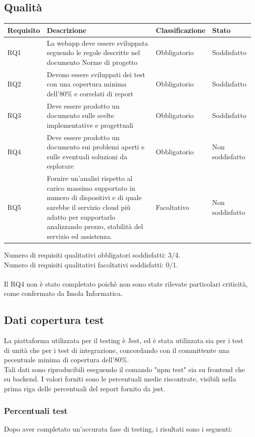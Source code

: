 \documentclass[12pt]{article}
\begin{document}
	\subsection{Qualità}
	\begin{tabular}{ |p{1.8cm}|p{5.2cm}|p{3cm}| p{2cm}| }
	\hline
	Requisito& Descrizione &Classificazione & Stato \\
	\hline
	RQ1 & La webapp deve essere sviluppata seguendo le regole descritte nel documento Norme di progetto & Obbligatorio & Soddisfatto \\
	RQ2 & Devono essere sviluppati dei test con una copertura minima dell'80\% e correlati di report & Obbligatorio & Soddisfatto\\
	RQ3 & Deve essere prodotto un documento sulle scelte implementative e progettuali & Obbligatorio & Soddisfatto \\
	RQ4 & Deve essere prodotto un documento sui problemi aperti e sulle eventuali soluzioni da esplorare & Obbligatorio & Non soddisfatto \\
	RQ5 & Fornire un’analisi rispetto al carico massimo supportato in numero di dispositivi e di quale sarebbe il servizio cloud più adatto per supportarlo analizzando prezzo, stabilità del servizio ed assistenza.  &  Facoltativo & Non soddisfatto \\
	\hline
	
	\end{tabular}
	Numero di requisiti qualitativi obbligatori soddisfatti: 3/4.\\
	Numero di requisiti qualitativi facoltativi soddisfatti: 0/1.
	\\
	\\

	Il RQ4 non è stato completato poichè non sono state rilevate particolari criticità, come confermato da Imola Informatica.
\subsection{Dati copertura test}
La piattaforma utilizzata per il testing è Jest, ed è stata utilizzata sia per i test di unità che per i test di integrazione, concordando con il committente una pecentuale minima di copertura dell'80\%.
\\Tali dati sono riproducibili eseguendo il comando "npm test" sia su frontend che su backend. I valori forniti sono le percentuali medie riscontrate, visibili nella prima riga delle percentuali del report fornito da jest.
	\subsubsection{Percentuali test}
	Dopo aver completato un'accurata fase di testing, i risultati sono i seguenti:
	\\
\end{document}
